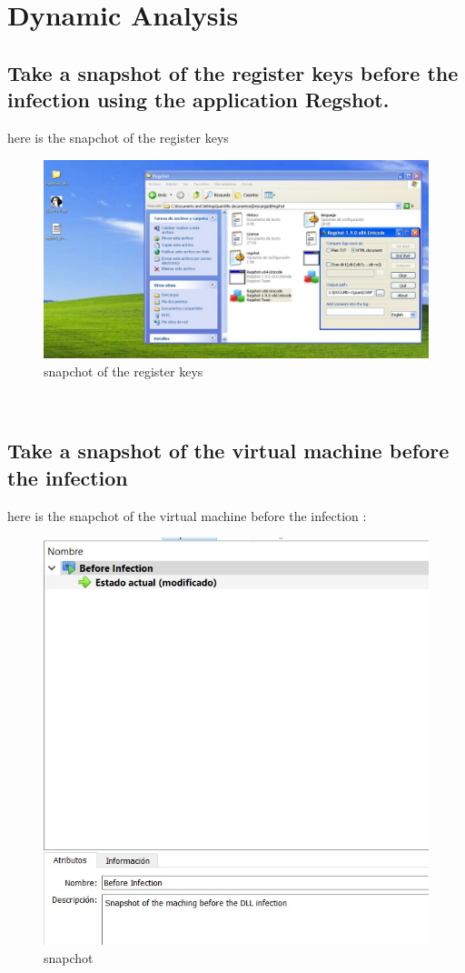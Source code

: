 \documentclass[12pt,letter]{article} %
\begin{document}

    \section{Dynamic Analysis}

        \subsection{Take a snapshot of the register keys before the infection using the application Regshot.}
            here is the snapchot of the register keys
            \\
            \begin{figure}[h!]
                \centering
                \includegraphics[width=0.5\linewidth]{punto1.jpeg}
                \caption{snapchot of the register keys}
                \label{snapchot register keys}
            \end{figure}
            \\

        \subsection{Take a snapshot of the virtual machine before the infection}
            here is the snapchot of the virtual machine before the infection  :
            \\
            \begin{figure}[h!]
                \centering
                \includegraphics[width=0.5\linewidth]{punto2.jpeg}
                \caption{snapchot}
                \label{snapchot of the virtual machine before the infection}
            \end{figure}
            \\
\end{document}
